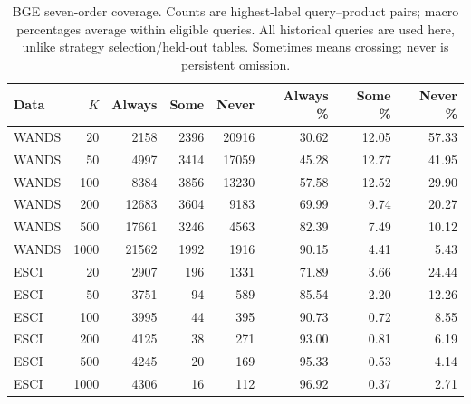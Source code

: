 \begin{table}[tp]
\caption{BGE seven-order coverage. Counts are highest-label query--product pairs; macro percentages average within eligible queries. All historical queries are used here, unlike strategy selection/held-out tables. Sometimes means crossing; never is persistent omission.}\label{tab:allcoverage}
\centering\small
\begin{tabular}{lrrrrrrr}\toprule
Data & $K$ & Always & Some & Never & Always \% & Some \% & Never \%\\\midrule
WANDS & 20 & 2158 & 2396 & 20916 & 30.62 & 12.05 & 57.33\\
WANDS & 50 & 4997 & 3414 & 17059 & 45.28 & 12.77 & 41.95\\
WANDS & 100 & 8384 & 3856 & 13230 & 57.58 & 12.52 & 29.90\\
WANDS & 200 & 12683 & 3604 & 9183 & 69.99 & 9.74 & 20.27\\
WANDS & 500 & 17661 & 3246 & 4563 & 82.39 & 7.49 & 10.12\\
WANDS & 1000 & 21562 & 1992 & 1916 & 90.15 & 4.41 & 5.43\\
ESCI & 20 & 2907 & 196 & 1331 & 71.89 & 3.66 & 24.44\\
ESCI & 50 & 3751 & 94 & 589 & 85.54 & 2.20 & 12.26\\
ESCI & 100 & 3995 & 44 & 395 & 90.73 & 0.72 & 8.55\\
ESCI & 200 & 4125 & 38 & 271 & 93.00 & 0.81 & 6.19\\
ESCI & 500 & 4245 & 20 & 169 & 95.33 & 0.53 & 4.14\\
ESCI & 1000 & 4306 & 16 & 112 & 96.92 & 0.37 & 2.71\\
\bottomrule\end{tabular}
\end{table}
